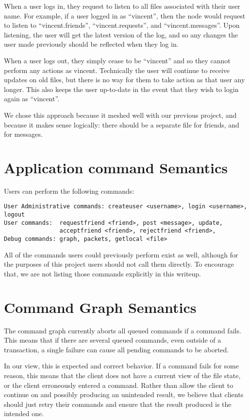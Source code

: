 \documentclass[11pt]{article}
\begin{document}
When a user logs in, they request to listen to all files associated with their user name. For example, if a user logged in as ``vincent'', then the node would request to listen to ``vincent.friends'', ``vincent.requests'', and ``vincent.messages''. Upon listening, the user will get the latest version of the log, and so any changes the user made previously should be reflected when they log in. 

When a user logs out, they simply cease to be ``vincent'' and so they cannot perform any actions as vincent. Technically the user will continue to receive updates on old files, but there is no way for them to take action as that user any longer. This also keeps the user up-to-date in the event that they wish to login again as ``vincent''.

We chose this approach because it meshed well with our previous project, and because it makes sense logically: there should be a separate file for friends, and for messages. 

\section{Application command Semantics}

Users can perform the following commands:
\begin{verbatim}
User Administrative commands: createuser <username>, login <username>, logout
User commands:  requestfriend <friend>, post <message>, update, 
                acceptfriend <friend>, rejectfriend <friend>,
Debug commands: graph, packets, getlocal <file>
\end{verbatim}

All of the commands users could previously perform exist as well, although for the purposes of this project users should not call them directly. To encourage that, we are not listing those commands explicitly in this writeup.

\section{Command Graph Semantics}

The command graph currently aborts all queued commands if a command fails.  This means that if there are several queued commands, even outside of a transaction, a single failure can cause all pending commands to be aborted. 

In our view, this is expected and correct behavior. If a command fails for some reason, this means that the client does not have a current view of the file state, or the client erroneously entered a command. Rather than allow the client to continue on and possibly producing an unintended result, we believe that clients should just retry their commands and ensure that the result produced is the intended one.
\end{document}
